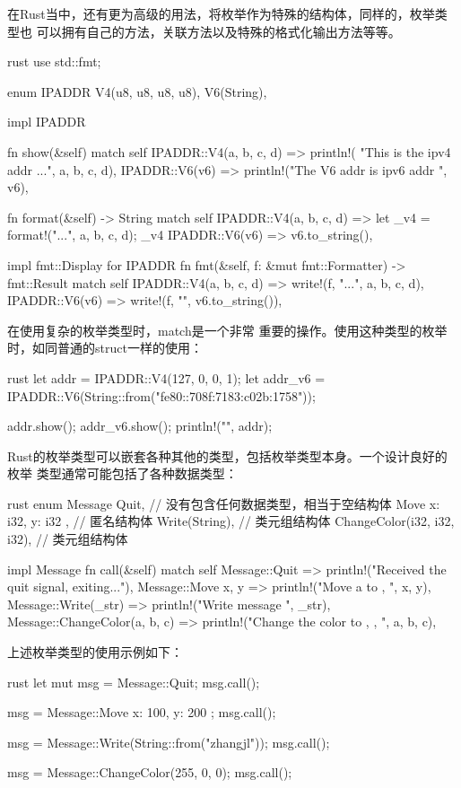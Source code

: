 在Rust当中，还有更为高级的用法，将枚举作为特殊的结构体，同样的，枚举类型也
可以拥有自己的方法，关联方法以及特殊的格式化输出方法等等。
\begin{code-block}{rust}
use std::fmt;

enum IPADDR {
    V4(u8, u8, u8, u8),
    V6(String),
}

impl IPADDR {
    fn show(&self) {
        match self {
            IPADDR::V4(a, b, c, d) => println!(
                "This is the ipv4 addr {}.{}.{}.{}", a, b, c, d),
            IPADDR::V6(v6) => println!("The V6 addr is ipv6 addr {}", v6),
        }
    }

    fn format(&self) -> String {
        match self {
            IPADDR::V4(a, b, c, d) => {
                let _v4 = format!("{}.{}.{}.{}", a, b, c, d);
                _v4
            }
            IPADDR::V6(v6) => v6.to_string(),
        }
    }
}

impl fmt::Display for IPADDR {
    fn fmt(&self, f: &mut fmt::Formatter) -> fmt::Result {
        match self {
            IPADDR::V4(a, b, c, d) => write!(f, "{}.{}.{}.{}", a, b, c, d),
            IPADDR::V6(v6) => write!(f, "{}", v6.to_string()),
        }
    }
}
\end{code-block}
在使用复杂的枚举类型时，match是一个非常
重要的操作。使用这种类型的枚举时，如同普通的struct一样的使用：
\begin{code-block}{rust}
let addr = IPADDR::V4(127, 0, 0, 1);
let addr_v6 = IPADDR::V6(String::from("fe80::708f:7183:c02b:1758"));

addr.show();
addr_v6.show();
println!("{}", addr);
\end{code-block}

Rust的枚举类型可以嵌套各种其他的类型，包括枚举类型本身。一个设计良好的枚举
类型通常可能包括了各种数据类型：
\begin{code-block}{rust}
enum Message {
    Quit, // 没有包含任何数据类型，相当于空结构体
    Move { x: i32, y: i32 }, // 匿名结构体
    Write(String), // 类元组结构体
    ChangeColor(i32, i32, i32), // 类元组结构体
}

impl Message {
    fn call(&self) {
        match self {
            Message::Quit => println!("Received the quit signal, exiting..."),
            Message::Move { x, y } => println!("Move a to {}, {}", x, y),
            Message::Write(_str) => println!("Write message {}", _str),
            Message::ChangeColor(a, b, c) => println!("Change the color to {}, {}, {}", a, b, c),
        }
    }
}
\end{code-block}
上述枚举类型的使用示例如下：
\begin{code-block}{rust}
let mut msg = Message::Quit;
msg.call();

msg = Message::Move { x: 100, y: 200 };
msg.call();

msg = Message::Write(String::from("zhangjl"));
msg.call();

msg = Message::ChangeColor(255, 0, 0);
msg.call();
\end{code-block}

